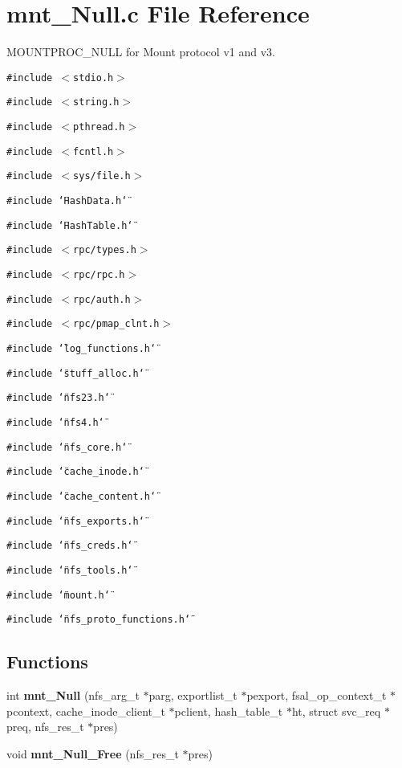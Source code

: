 \section{mnt\_\-Null.c File Reference}
\label{mnt__Null_8c}
MOUNTPROC\_\-NULL for Mount protocol v1 and v3. 

{\tt \#include $<$stdio.h$>$}\par
{\tt \#include $<$string.h$>$}\par
{\tt \#include $<$pthread.h$>$}\par
{\tt \#include $<$fcntl.h$>$}\par
{\tt \#include $<$sys/file.h$>$}\par
{\tt \#include \char`\"{}Hash\-Data.h\char`\"{}}\par
{\tt \#include \char`\"{}Hash\-Table.h\char`\"{}}\par
{\tt \#include $<$rpc/types.h$>$}\par
{\tt \#include $<$rpc/rpc.h$>$}\par
{\tt \#include $<$rpc/auth.h$>$}\par
{\tt \#include $<$rpc/pmap\_\-clnt.h$>$}\par
{\tt \#include \char`\"{}log\_\-functions.h\char`\"{}}\par
{\tt \#include \char`\"{}stuff\_\-alloc.h\char`\"{}}\par
{\tt \#include \char`\"{}nfs23.h\char`\"{}}\par
{\tt \#include \char`\"{}nfs4.h\char`\"{}}\par
{\tt \#include \char`\"{}nfs\_\-core.h\char`\"{}}\par
{\tt \#include \char`\"{}cache\_\-inode.h\char`\"{}}\par
{\tt \#include \char`\"{}cache\_\-content.h\char`\"{}}\par
{\tt \#include \char`\"{}nfs\_\-exports.h\char`\"{}}\par
{\tt \#include \char`\"{}nfs\_\-creds.h\char`\"{}}\par
{\tt \#include \char`\"{}nfs\_\-tools.h\char`\"{}}\par
{\tt \#include \char`\"{}mount.h\char`\"{}}\par
{\tt \#include \char`\"{}nfs\_\-proto\_\-functions.h\char`\"{}}\par
\subsection*{Functions}
\begin{CompactItemize}
\item 
int {\bf mnt\_\-Null} (nfs\_\-arg\_\-t $\ast$parg, exportlist\_\-t $\ast$pexport, fsal\_\-op\_\-context\_\-t $\ast$pcontext, cache\_\-inode\_\-client\_\-t $\ast$pclient, hash\_\-table\_\-t $\ast$ht, struct svc\_\-req $\ast$preq, nfs\_\-res\_\-t $\ast$pres)
\item 
void {\bf mnt\_\-Null\_\-Free} (nfs\_\-res\_\-t $\ast$pres)
\end{CompactItemize}


